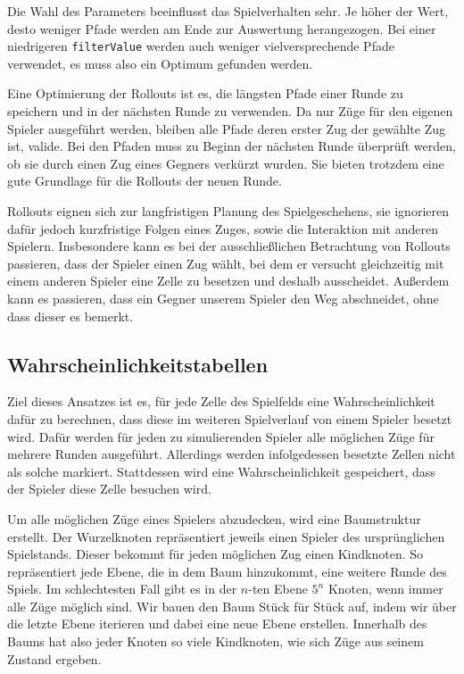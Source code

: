 \documentclass[12pt,a4paper]{article}
\begin{document}
Die Wahl des Parameters beeinflusst das Spielverhalten sehr. Je höher der Wert, desto weniger Pfade werden am Ende zur Auswertung herangezogen. Bei einer niedrigeren \texttt{filterValue} werden auch weniger vielversprechende Pfade verwendet, es muss also ein Optimum gefunden werden.

Eine Optimierung der Rollouts ist es, die längsten Pfade einer Runde zu speichern und in der nächsten Runde zu verwenden. Da nur Züge für den eigenen Spieler ausgeführt werden, bleiben alle Pfade deren erster Zug der gewählte Zug ist, valide. Bei den Pfaden muss zu Beginn der nächsten Runde überprüft werden, ob sie durch einen Zug eines Gegners verkürzt wurden. Sie bieten trotzdem eine gute Grundlage für die Rollouts der neuen Runde.

Rollouts eignen sich zur langfristigen Planung des Spielgeschehens, sie ignorieren dafür jedoch kurzfristige Folgen eines Zuges, sowie die Interaktion mit anderen Spielern. Insbesondere kann es bei der ausschließlichen Betrachtung von Rollouts passieren, dass der Spieler einen Zug wählt, bei dem er versucht gleichzeitig mit einem anderen Spieler eine Zelle zu besetzen und deshalb ausscheidet. Außerdem kann es passieren, dass ein Gegner unserem Spieler den Weg abschneidet, ohne dass dieser es bemerkt.

\subsection{Wahrscheinlichkeitstabellen} \label{sec:probability-tables}
Ziel dieses Ansatzes ist es, für jede Zelle des Spielfelds eine Wahrscheinlichkeit dafür zu berechnen, dass diese im weiteren Spielverlauf von einem Spieler besetzt wird.
Dafür werden für jeden zu simulierenden Spieler alle möglichen Züge für mehrere Runden ausgeführt. Allerdings werden infolgedessen besetzte Zellen nicht als solche markiert. Stattdessen wird eine Wahrscheinlichkeit gespeichert, dass der Spieler diese Zelle besuchen wird.

Um alle möglichen Züge eines Spielers abzudecken, wird eine Baumstruktur erstellt. Der Wurzelknoten repräsentiert jeweils einen Spieler des ursprünglichen Spielstands. Dieser bekommt für jeden möglichen Zug einen Kindknoten. So repräsentiert jede Ebene, die in dem Baum hinzukommt, eine weitere Runde des Spiels. Im schlechtesten Fall gibt es in der $n$-ten Ebene $5^n$ Knoten, wenn immer alle Züge möglich sind. Wir bauen den Baum Stück für Stück auf, indem wir über die letzte Ebene iterieren und dabei eine neue Ebene erstellen. Innerhalb des Baums hat also jeder Knoten so viele Kindknoten, wie sich Züge aus seinem Zustand ergeben.
\end{document}
